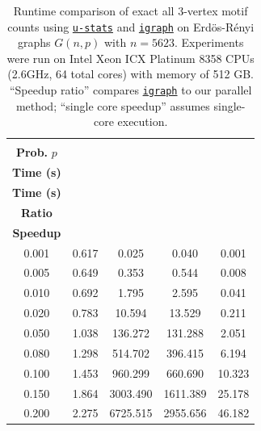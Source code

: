 \documentclass[twoside,11pt]{article}
\newcommand{\libref}[2]{\href{#2}{\texttt{#1}}}
\def\package{\libref{u-stats}{https://github.com/zrq1706/U-Statistics-python}}
\def\igraph{\libref{igraph}{https://igraph.org/}}
\begin{document}
\begin{table}[ht]
\centering
\caption{
Runtime comparison of exact all $3$-vertex motif counts using \package{} and \igraph{} on Erd\"{o}s-R\'{e}nyi graphs $G(n, p)$ with $n = 5623$. 
Experiments were run on Intel Xeon ICX Platinum 8358 CPUs (2.6GHz, 64 total cores) with memory of 512 GB.
“Speedup ratio” compares \igraph{} to our parallel method; “single core speedup” assumes single-core execution.
}

\label{tab:motif_counts_3}
\begin{tabular}{ccccc}
\toprule
\makecell{\textbf{Edge} \\ \textbf{Prob.} $p$} & \makecell{\package{} \\ \textbf{Time (s)}} & \makecell{\textbf{\igraph{}} \\ \textbf{Time (s)}} &\makecell{\textbf{Speedup} \\ \textbf{Ratio}} &  \makecell{\textbf{Single-Core} \\ \textbf{Speedup}} \\
\midrule
0.001 & 0.617 & 0.025 & 0.040 & 0.001 \\
0.005 & 0.649 & 0.353 & 0.544 & 0.008 \\
0.010 & 0.692 & 1.795 & 2.595 & 0.041 \\
0.020 & 0.783 & 10.594 & 13.529 & 0.211 \\
0.050 & 1.038 & 136.272 & 131.288 & 2.051 \\
0.080 & 1.298 & 514.702 & 396.415 & 6.194 \\
0.100 & 1.453 & 960.299 & 660.690 & 10.323 \\
0.150 & 1.864 & 3003.490 & 1611.389 & 25.178 \\
0.200 & 2.275 & 6725.515 & 2955.656 & 46.182 \\
\bottomrule
\end{tabular}
\end{table}
\end{document}
